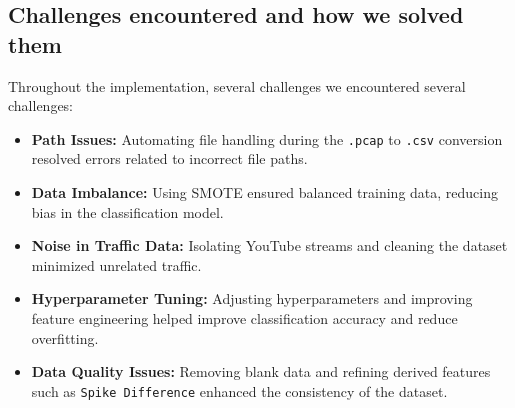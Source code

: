 \subsection{Challenges encountered and how we solved them}
Throughout the implementation, several challenges we encountered several challenges:
\begin{itemize}
    \item \textbf{Path Issues:} Automating file handling during the \texttt{.pcap} to \texttt{.csv} conversion resolved errors related to incorrect file paths.
    \item \textbf{Data Imbalance:} Using SMOTE ensured balanced training data, reducing bias in the classification model.
    \item \textbf{Noise in Traffic Data:} Isolating YouTube streams and cleaning the dataset minimized unrelated traffic.
    \item \textbf{Hyperparameter Tuning:} Adjusting hyperparameters and improving feature engineering helped improve classification accuracy and reduce overfitting.
    \item \textbf{Data Quality Issues:} Removing blank data and refining derived features such as \texttt{Spike Difference} enhanced the consistency of the dataset.
\end{itemize}

